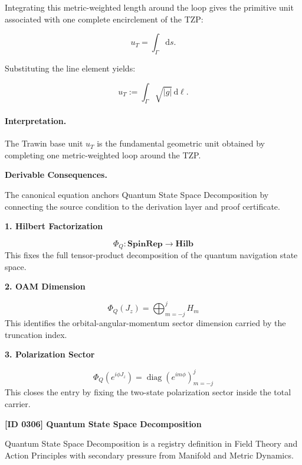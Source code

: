 Integrating this metric-weighted length around the loop gives the primitive unit associated with one complete encirclement of the TZP:

\begin{equation}
u_T = \int_{\Gamma}\mathrm{d}s .
\end{equation}

Substituting the line element yields:

\begin{equation}
\boxed{
u_T := \int_{\Gamma}\sqrt{|g|}\,\mathrm{d}\ell .
}
\end{equation}

\paragraph{Interpretation.}
The Trawin base unit $u_T$ is the fundamental geometric unit obtained by completing one metric-weighted loop around the TZP.

\par\vspace{0.35em}
\noindent\textbf{Derivable Consequences.}\quad
\begingroup
\footnotesize
\raggedright
The canonical equation anchors Quantum State Space Decomposition by connecting the source condition to the derivation layer and proof certificate.
\par\endgroup

\noindent\textbf{1. Hilbert Factorization}\par
\[
\Phi_Q:\mathbf{SpinRep}\to\mathbf{Hilb}
\]
\noindent This fixes the full tensor-product decomposition of the quantum navigation state space.\par
\noindent\textbf{2. OAM Dimension}\par
\[
\Phi_Q(J_z)=\bigoplus_{m=-j}^{j}H_m
\]
\noindent This identifies the orbital-angular-momentum sector dimension carried by the truncation index.\par
\noindent\textbf{3. Polarization Sector}\par
\[
\Phi_Q(e^{i\phi J_z})=\operatorname{diag}(e^{im\phi})_{m=-j}^{j}
\]
\noindent This closes the entry by fixing the two-state polarization sector inside the total carrier.\par

\clearpage
\noindent\textbf{[ID 0306] Quantum State Space Decomposition}\par
\vspace{0.35em}
\begingroup\small
{}
Quantum State Space Decomposition is a registry definition in Field Theory and Action Principles with secondary pressure from Manifold and Metric Dynamics.

